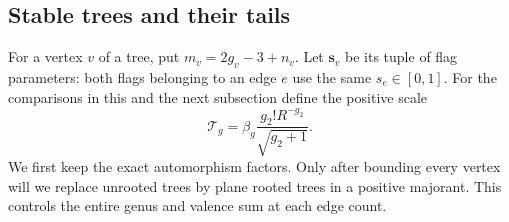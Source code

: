 \subsection{Stable trees and their tails}
\label{subsec:s06:03}

For a vertex $v$ of a tree, put $m_v=2g_v-3+n_v$. Let
$\mathbf s_v$ be its tuple of flag parameters: both flags belonging
to an edge $e$ use the same $s_e\in[0,1]$.
For the comparisons in this and the next subsection define the
positive scale
\begin{equation}\label{eq:s06:tree-scale}
 \mathcal T_g=\beta_g\frac{g_2!R^{-g_2}}{\sqrt{g_2+1}}.
\end{equation}
We first keep the exact automorphism factors. Only after bounding
every vertex will we replace unrooted trees by plane rooted trees
in a positive majorant. This controls the entire genus and valence
sum at each edge count.

